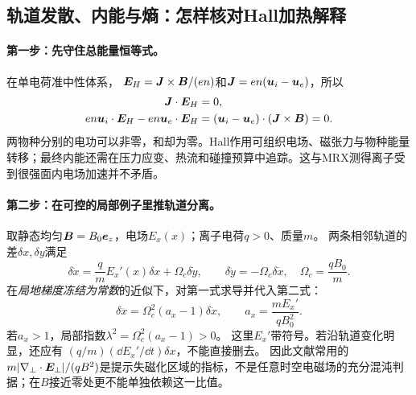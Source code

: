 \documentclass[UTF8,a4paper,11pt,openany,fontset=fandol]{ctexbook}
\begin{document}

\subsection{轨道发散、内能与熵：怎样核对Hall加热解释}\label{sec:synthesis-heating-model}
\paragraph{第一步：先守住总能量恒等式。}
在单电荷准中性体系，
$\bm{E}_H=\bm{J}\times\bm{B}/(en)$和$\bm{J}=en(\bm{u}_i-\bm{u}_e)$，所以
\begin{align}
\bm{J}\cdot\bm{E}_H&=0,\\
en\bm{u}_i\cdot\bm{E}_H-en\bm{u}_e\cdot\bm{E}_H
 &= (\bm{u}_i-\bm{u}_e)\cdot(\bm{J}\times\bm{B})=0.
\end{align}
两物种分别的电功可以非零，和却为零。Hall作用可组织电场、磁张力与物种能量转移；最终内能还需在压力应变、热流和碰撞预算中追踪。这与MRX测得离子受到很强面内电场加速并不矛盾。\citep{Yoo2013,L272}

\paragraph{第二步：在可控的局部例子里推轨道分离。}
取静态均匀$\bm{B}=B_0\bm{e}_z$，电场$E_x(x)$；离子电荷$q>0$、质量$m$。
两条相邻轨道的差$\delta x,\delta y$满足
\begin{equation}
\delta\ddot x=\frac qm E_x'(x)\delta x+\Omega_c\delta\dot y,\qquad
\delta\ddot y=-\Omega_c\delta\dot x,\quad \Omega_c=\frac{qB_0}{m}.
\end{equation}
在\emph{局地梯度冻结为常数}的近似下，对第一式求导并代入第二式：
\begin{equation}
\delta\dddot x=\Omega_c^2(a_x-1)\delta\dot x,\qquad
a_x=\frac{mE_x'}{qB_0^2}.
\end{equation}
若$a_x>1$，局部指数$\lambda^2=\Omega_c^2(a_x-1)>0$。
这里$E_x'$带符号。若沿轨道变化明显，还应有
$(q/m)(\dd E_x'/\dd t)\delta x$，不能直接删去。
因此文献常用的
$m|\nabla_\perp\cdot\bm{E}_\perp|/(qB^2)$是提示失磁化区域的指标，不是任意时空电磁场的充分混沌判据；在$B$接近零处更不能单独依赖这一比值。
\end{document}
